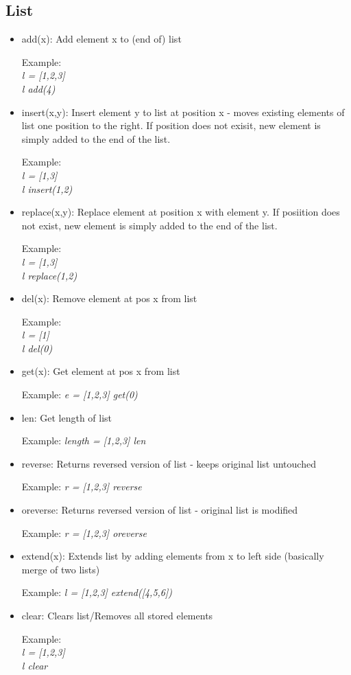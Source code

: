 \documentclass{article}
\begin{document}
\subsection{List}
\begin{itemize}
\item add(x): Add element x to (end of) list

Example: \\ \textit{l = [1,2,3]} \\ \textit{l add(4)}

\item insert(x,y): Insert element y to list at position x - moves existing elements of list one position to the right. If position does not exisit, new element is simply added to the end of the list.

Example: \\ \textit{l = [1,3]} \\ \textit{l insert(1,2)}

\item replace(x,y): Replace element at position x with element y. If posiition does not exist, new element is simply added to the end of the list.

Example: \\ \textit{l = [1,3]} \\ \textit{l replace(1,2)}

\item del(x): Remove element at pos x from list

Example: \\ \textit{l = [1]} \\ \textit{l del(0)}

\item get(x): Get element at pos x from list

Example: \textit{e = [1,2,3] get(0)}

\item len: Get length of list

Example: \textit{length = [1,2,3] len}

\item reverse: Returns reversed version of list - keeps original list untouched

Example: \textit{r = [1,2,3] reverse}

\item oreverse: Returns reversed version of list - original list is modified

Example: \textit{r = [1,2,3] oreverse}

\item extend(x): Extends list by adding elements from x to left side (basically merge of two lists)

Example: \textit{l = [1,2,3] extend([4,5,6])}

\item clear: Clears list/Removes all stored elements

Example: \\ \textit{l = [1,2,3]} \\ \textit{l clear}
\end{itemize}
\end{document}
